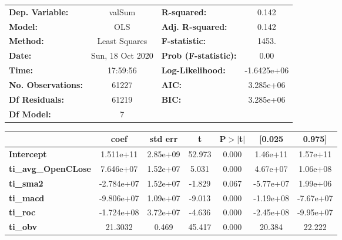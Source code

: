 \begin{center}
\begin{tabular}{lclc}
\toprule
\textbf{Dep. Variable:}     &      valSum      & \textbf{  R-squared:         } &      0.142   \\
\textbf{Model:}             &       OLS        & \textbf{  Adj. R-squared:    } &      0.142   \\
\textbf{Method:}            &  Least Squares   & \textbf{  F-statistic:       } &      1453.   \\
\textbf{Date:}              & Sun, 18 Oct 2020 & \textbf{  Prob (F-statistic):} &      0.00    \\
\textbf{Time:}              &     17:59:56     & \textbf{  Log-Likelihood:    } & -1.6425e+06  \\
\textbf{No. Observations:}  &       61227      & \textbf{  AIC:               } &  3.285e+06   \\
\textbf{Df Residuals:}      &       61219      & \textbf{  BIC:               } &  3.285e+06   \\
\textbf{Df Model:}          &           7      & \textbf{                     } &              \\
\bottomrule
\end{tabular}
\begin{tabular}{lcccccc}
                            & \textbf{coef} & \textbf{std err} & \textbf{t} & \textbf{P$> |$t$|$} & \textbf{[0.025} & \textbf{0.975]}  \\
\midrule
\textbf{Intercept}          &    1.511e+11  &     2.85e+09     &    52.973  &         0.000        &     1.46e+11    &     1.57e+11     \\
\textbf{ti\_avg\_OpenCLose} &    7.646e+07  &     1.52e+07     &     5.031  &         0.000        &     4.67e+07    &     1.06e+08     \\
\textbf{ti\_sma2}           &   -2.784e+07  &     1.52e+07     &    -1.829  &         0.067        &    -5.77e+07    &     1.99e+06     \\
\textbf{ti\_macd}           &   -9.806e+07  &     1.09e+07     &    -9.013  &         0.000        &    -1.19e+08    &    -7.67e+07     \\
\textbf{ti\_roc}            &   -1.724e+08  &     3.72e+07     &    -4.636  &         0.000        &    -2.45e+08    &    -9.95e+07     \\
\textbf{ti\_obv}            &      21.3032  &        0.469     &    45.417  &         0.000        &       20.384    &       22.222     \\

\end{tabular}
\end{center}
